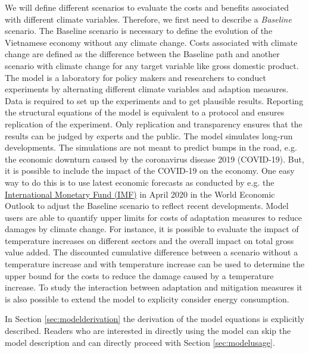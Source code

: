 \documentclass[10pt,a4paper]{article}
\begin{document}
We will define different scenarios to evaluate the costs and benefits associated with different climate variables. Therefore, we first need to describe a \emph{Baseline} scenario. The Baseline scenario is necessary to define the evolution of the Vietnamese economy without any climate change. Costs associated with climate change are defined as the difference between the Baseline path and another scenario with climate change for any target variable like gross domestic product. The model is a laboratory for policy makers and researchers to conduct experiments by alternating different climate variables and adaption measures. Data is required to set up the experiments and to get plausible results. Reporting the structural equations of the model is equivalent to a protocol and ensures replication of the experiment. Only replication and transparency ensures that the results can be judged by experts and the public. The model simulates long-run developments. The simulations are not meant to predict bumps in the road, e.g. the economic downturn caused by the coronavirus disease 2019 (COVID-19). But, it is possible to include the impact of the COVID-19 on the economy. One easy way to do this is to use latest economic forecasts as conducted by e.g. the \href{https://www.imf.org/en/Publications/WEO/Issues/2020/04/14/weo-april-2020}{International Monetary Fund (IMF)} in April 2020 in the World Economic Outlook to adjust the Baseline scenario to reflect recent developments. Model users are able to quantify upper limits for costs of adaptation measures to reduce damages by climate change. For instance, it is possible to evaluate the impact of temperature increases on different sectors and the overall impact on total gross value added. The discounted cumulative difference between a scenario without a temperature increase and with temperature increase can be used to determine the upper bound for the costs to reduce the damage caused by a temperature increase. To study the interaction between adaptation and mitigation measures it is also possible to extend the model to explicity consider energy consumption.

In Section \ref{sec:modelderivation} the derivation of the model equations is explicitly described. Readers who are interested in directly using the model can skip the model description and can directly proceed with Section \ref{sec:modelusage}.
\end{document}
